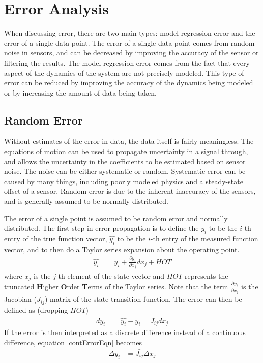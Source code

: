 \chapter{Error Analysis}
When discussing error, there are two main types: model regression error and the error of a single data point. The error of a single data point comes from random noise in sensors, and can be decreased by improving the accuracy of the sensor or filtering the results. The model regression error comes from the fact that every aspect of the dynamics of the system are not precisely modeled. This type of error can be reduced by improving the accuracy of the dynamics being modeled or by increasing the amount of data being taken.
\section{Random Error}
\label{pointErrorSection}
Without estimates of the error in data, the data itself is fairly meaningless. The equations of motion can be used to propagate uncertainty in a signal through, and allows the uncertainty in the coefficients to be estimated based on sensor noise. The noise can be either systematic or random. Systematic error can be caused by many things, including poorly modeled physics and a steady-state offset of a sensor. Random error is due to the inherent inaccuracy of the sensors, and is generally assumed to be normally distributed.

The error of a single point is assumed to be random error and normally distributed. The first step in error propagation is to define the $y_i$ to be the $i$-th entry of the true function vector, $\hat{y_i}$ to be the $i$-th entry of the measured function vector, and to then do a Taylor series expansion about the operating point.
\begin{align}
\hat{y_i} &= y_i + \frac{\partial{y_i}}{\partial{x_j}}dx_j+HOT
\end{align}
where $x_j$ is the $j$-th element of the state vector and $HOT$ represents the truncated  \textbf{H}igher \textbf{O}rder \textbf{T}erms of the Taylor series. Note that the term $\frac{\partial{y_i}}{\partial{x_j}}$ is the Jacobian ($\bar{J_{ij}}$) matrix of the state transition function. The error can then be defined as (dropping $HOT$)
\begin{align}
\label{contErrorEqn}
dy_i &= \hat{y_i}-y_i =  \bar{J_{ij}}dx_j
\end{align}
If the error is then interpreted as a discrete difference instead of a continuous difference, equation \ref{contErrorEqn} becomes
\begin{align}
\label{errorEqn}
\Delta y_i &= \bar{J_{ij}}\Delta x_j
\end{align}

